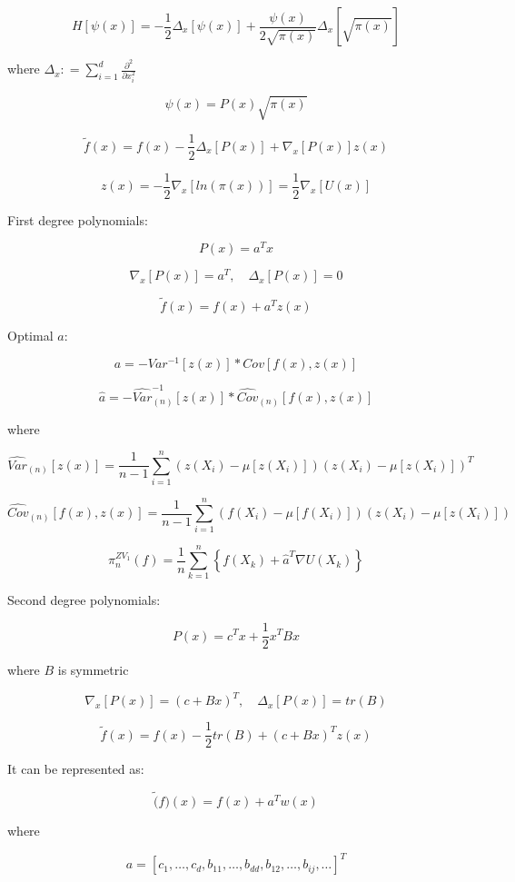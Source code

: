 \documentclass[a4paper]{article}
\begin{document}
$$H \left[ \psi(x)\right] = -\frac{1}{2} \Delta_x \left[\psi(x) \right] + \frac{\psi(x)}{2\sqrt{\pi(x)}} \Delta_x \left[ \sqrt{\pi(x)}\right]$$

where $\Delta_x : = \sum_{i = 1}^d \frac{\partial^2}{\partial x^2_i}$

$$\psi(x) = P(x)\sqrt{\pi(x)}$$

$$\tilde{f}(x) = f(x) - \frac{1}{2} \Delta_x \left[ P(x)\right] + \nabla_x \left[ P(x)\right] z(x)$$

$$z(x) = -\frac{1}{2} \nabla_x \left[ln (\pi(x)) \right] = \frac{1}{2} \nabla_x \left[U(x) \right]$$

 First degree polynomials:

$$P(x) = a^T x$$

$$\nabla_x \left[ P(x)\right] = a^T, \quad \Delta_x \left[ P(x)\right] = 0$$

$$\tilde{f}(x) = f(x) + a^T z(x)$$

Optimal $a$:

$$a = - Var^{-1} \left[z(x) \right] * Cov \left[ f(x), z(x)\right]$$

$$\hat{a} = - \hat{Var}^{-1}_{(n)}\left[ z(x)\right] * \hat{Cov}_{(n)} \left[ f(x), z(x)\right]$$

where 

$$\hat{Var}_{(n)}\left[ z(x)\right] = \frac{1}{n-1} \sum_{i=1}^n \left( z(X_i) - \mu\left[ z(X_i) \right]\right) \left( z(X_i) - \mu \left[ z(X_i)\right]\right)^T$$

$$\hat{Cov}_{(n)} \left[ f(x), z(x)\right] = \frac{1}{n-1} \sum_{i=1}^n \left( f(X_i) - \mu \left[ f(X_i)\right]\right)\left( z(X_i) - \mu \left[ z(X_i)\right]\right)$$

$$\pi_n^{ZV_1}(f) = \frac{1}{n} \sum_{k=1}^n \left\{ f(X_k) + \hat{a}^T \nabla U(X_k)\right\}$$

 Second degree polynomials:

$$P(x) = c^T x + \frac{1}{2} x^T B x$$

where $B$ is symmetric

$$\nabla_x \left[ P(x)\right] = (c + Bx)^T, \quad \Delta_x \left[ P(x)\right] = tr(B)$$

$$\tilde{f}(x) = f(x) - \frac{1}{2} tr(B) + (c + Bx)^T z(x)$$

It can be represented as:

$$\tilde(f)(x) = f(x) + a^T w(x)$$

where

$$a = \left[c_1, \dots, c_d, b_{11}, \dots, b_{dd}, b_{12}, \dots, b_{ij}, \dots \right]^T$$
\end{document}
